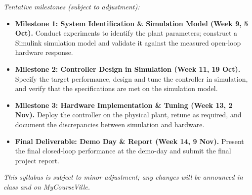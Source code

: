\documentclass[11pt]{article}
\begin{document}
\emph{Tentative milestones (subject to adjustment):}
\begin{itemize}
    \item \textbf{Milestone 1: System Identification \& Simulation Model (Week 9,
          5 Oct).} Conduct experiments to identify the plant parameters; construct a
          Simulink simulation model and validate it against the measured open-loop
          hardware response.
    \item \textbf{Milestone 2: Controller Design in Simulation (Week 11, 19 Oct).}
          Specify the target performance, design and tune the controller in simulation,
          and verify that the specifications are met on the simulation model.
    \item \textbf{Milestone 3: Hardware Implementation \& Tuning (Week 13, 2 Nov).}
          Deploy the controller on the physical plant, retune as required, and document
          the discrepancies between simulation and hardware.
    \item \textbf{Final Deliverable: Demo Day \& Report (Week 14, 9 Nov).} Present the
          final closed-loop performance at the demo-day and submit the final
          project report.
\end{itemize}

\vspace{6pt}
{\small\color{brandgray}\textit{This syllabus is subject to minor adjustment;
any changes will be announced in class and on MyCourseVille.}}
\end{document}
